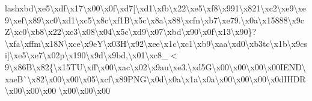 lash{}xbd\textbackslash{}xe5\textbackslash{}xdf\textbackslash{}x17\textbackslash{}x00\textbackslash{}x0f\textbackslash{}xd7\mbox{[}\textbackslash{}xd1\textbackslash{}xfb\textbackslash{}x22\textbackslash{}xe5\textbackslash{}xf8\textbackslash{}x991\textbackslash{}x821\textbackslash{}xc2\textbackslash{}xe9\textbackslash{}xe9\textbackslash{}xef\textbackslash{}x89\textbackslash{}xc0\textbackslash{}xd1\textbackslash{}xc5\textbackslash{}x8c\textbackslash{}xf1\+B\textbackslash{}x5c\textbackslash{}x8a\textbackslash{}x88\textbackslash{}xcfn\textbackslash{}xb7\textbackslash{}xe79.\textbackslash{}x0a\textbackslash{}x15888\textbackslash{}x9c\+Z\textbackslash{}xc0\textbackslash{}xb8\textbackslash{}x22\textbackslash{}xc3\textbackslash{}x08\textbackslash{}x04\textbackslash{}x5c\textbackslash{}xd9\textbackslash{}x07\textbackslash{}xbd\textbackslash{}x90\textbackslash{}x0f\textbackslash{}x13\textbackslash{}x90\}?\textbackslash{}xfa\textbackslash{}xffm\textbackslash{}x18\+N\textbackslash{}xce\textbackslash{}x9e\+Y\textbackslash{}x03\+H\textbackslash{}x92\textbackslash{}xee\textbackslash{}x1c\textbackslash{}xc1\textbackslash{}xb9\textbackslash{}xaa\textbackslash{}xd0\textbackslash{}xb3tc\textbackslash{}x1b\textbackslash{}x9csi\mbox{]}\textbackslash{}xe5\textbackslash{}xe7\textbackslash{}x02p\textbackslash{}x190\textbackslash{}x9d\textbackslash{}x9bd,\textbackslash{}x01\textbackslash{}xc8\+\_\+$<$9\textbackslash{}x86\+B\textbackslash{}x82\{\textbackslash{}x15\+T\+U\textbackslash{}xff\textbackslash{}x00\textbackslash{}xac\textbackslash{}x02\textbackslash{}x9au\textbackslash{}xe3.\textbackslash{}xd5\+G\textbackslash{}x00\textbackslash{}x00\textbackslash{}x00\textbackslash{}x00\+I\+E\+N\+D\textbackslash{}xae\+B\`{}\textbackslash{}x82\textbackslash{}x00\textbackslash{}x00\textbackslash{}x05\textbackslash{}xcf\textbackslash{}x89\+P\+N\+G\textbackslash{}x0d\textbackslash{}x0a\textbackslash{}x1a\textbackslash{}x0a\textbackslash{}x00\textbackslash{}x00\textbackslash{}x00\textbackslash{}x0d\+I\+H\+D\+R\textbackslash{}x00\textbackslash{}x00\textbackslash{}x00 \textbackslash{}x00\textbackslash{}x00\textbackslash{}x00 
